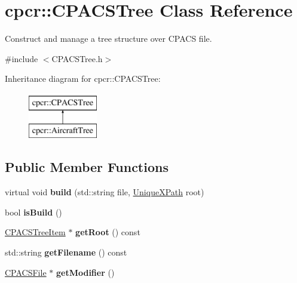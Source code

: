 \hypertarget{classcpcr_1_1CPACSTree}{\section{cpcr\-:\-:C\-P\-A\-C\-S\-Tree Class Reference}
\label{classcpcr_1_1CPACSTree}
}


Construct and manage a tree structure over C\-P\-A\-C\-S file.  




{\ttfamily \#include $<$C\-P\-A\-C\-S\-Tree.\-h$>$}

Inheritance diagram for cpcr\-:\-:C\-P\-A\-C\-S\-Tree\-:\begin{figure}[H]
\begin{center}
\leavevmode
\includegraphics[height=2.000000cm]{classcpcr_1_1CPACSTree}
\end{center}
\end{figure}
\subsection*{Public Member Functions}
\begin{DoxyCompactItemize}
\item 
\hypertarget{classcpcr_1_1CPACSTree_acf68c4bcc9b1252337e1bd086059b7fd}{virtual void {\bfseries build} (std\-::string file, \hyperlink{classcpcr_1_1UniqueXPath}{Unique\-X\-Path} root)}\label{classcpcr_1_1CPACSTree_acf68c4bcc9b1252337e1bd086059b7fd}

\item 
\hypertarget{classcpcr_1_1CPACSTree_a3415e21a201b47eb3b74db22eb8d23c0}{bool {\bfseries is\-Build} ()}\label{classcpcr_1_1CPACSTree_a3415e21a201b47eb3b74db22eb8d23c0}

\item 
\hypertarget{classcpcr_1_1CPACSTree_a6b05f2d3f732821ccdfe7e6d77f183b2}{\hyperlink{classcpcr_1_1CPACSTreeItem}{C\-P\-A\-C\-S\-Tree\-Item} $\ast$ {\bfseries get\-Root} () const }\label{classcpcr_1_1CPACSTree_a6b05f2d3f732821ccdfe7e6d77f183b2}

\item 
\hypertarget{classcpcr_1_1CPACSTree_a1b464498212a24ac5539f38b691ba284}{std\-::string {\bfseries get\-Filename} () const }\label{classcpcr_1_1CPACSTree_a1b464498212a24ac5539f38b691ba284}

\item 
\hypertarget{classcpcr_1_1CPACSTree_a943576f97f72332d988d232484072469}{\hyperlink{classcpcr_1_1CPACSFile}{C\-P\-A\-C\-S\-File} $\ast$ {\bfseries get\-Modifier} ()}\label{classcpcr_1_1CPACSTree_a943576f97f72332d988d232484072469}

\end{DoxyCompactItemize}
